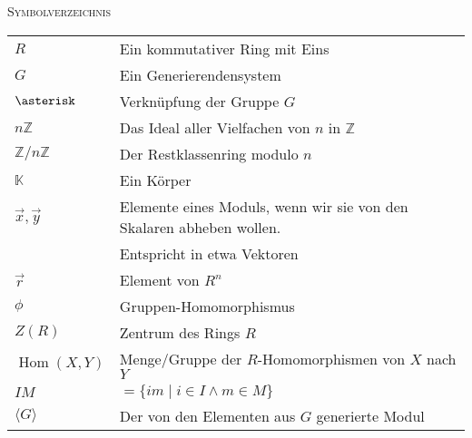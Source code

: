 \documentclass[a4paper]{amsart}
\theoremstyle{definition}
\DeclareMathOperator{\Hom}{Hom}
\newcommand{\Z}{\ensuremath{\mathbb{ Z }}}
\newcommand{\K}{\ensuremath{\mathbb{ K }}}
\newcommand{\zz}[1]{\ensuremath{\Z /#1\Z}}
\begin{document}
\begin{large}
    \centerline{\textsc{Symbolverzeichnis}}
\end{large}
\bigskip

\renewcommand*{\arraystretch}{1}

\begin{tabular}{ll}
    $R$                                 & Ein kommutativer Ring mit Eins\\
    $G$                                 & Ein Generierendensystem\\
    $\asterisk$                         & Verknüpfung der Gruppe $G$\\
    $n\Z$                               & Das Ideal aller Vielfachen von $n$ in $\Z$\\
    $\zz{n}$                            & Der Restklassenring modulo $n$\\
    $\K$                                & Ein Körper\\
    $\vec x, \vec y$                    & Elemente eines Moduls, wenn wir sie von den Skalaren abheben wollen. \\
                                        & Entspricht in etwa Vektoren\\
    $\vec r$                            & Element von $R^n$\\
    $\phi$                              & Gruppen-Homomorphismus\\
    $Z(R)$                              & Zentrum des Rings $R$\\
    $\Hom(X,Y)$                         & Menge/Gruppe der $R$-Homomorphismen von $X$ nach $Y$\\
    $IM$                                & $= \{ im \mid i \in I \land m\in M \}$\\
    $\langle G \rangle$                 & Der von den Elementen aus $G$ generierte Modul
    
\end{tabular}
\end{document}
